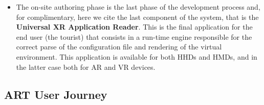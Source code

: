 \begin{itemize}
    \item The on-site authoring phase is the last phase of the development process and, for complimentary, here we cite the last component of the system, that is the \textbf{Universal \gls{XR} Application Reader}. This is the final application for the end user (the tourist) that consists in a run-time engine responsible for the correct parse of the configuration file and rendering of the virtual environment. This application is available for both \glspl{HHD} and \glspl{HMD}, and in the latter case both for \gls{AR} and \gls{VR} devices.
\end{itemize}



\subsection{ART User Journey}
\label{subsec:art-user-journey}

